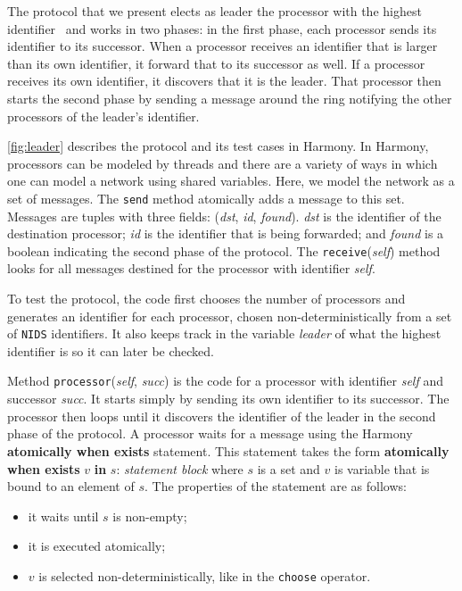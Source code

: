\documentclass{report}
\begin{document}
The protocol that we present elects as leader the processor with the
highest identifier~\cite{CR79} and works in two phases: in the first
phase, each processor sends its identifier to its successor.  When
a processor receives an identifier that is larger than its own
identifier, it forward that to its successor as well.  If a processor
receives its own identifier, it discovers that it is the leader.  That
processor then starts the second phase by sending a message around the
ring notifying the other processors of the leader's identifier.

\autoref{fig:leader} describes the protocol and its test cases in Harmony.
In Harmony, processors can be modeled by threads and there are a variety of ways in
which one can model a network using shared variables.
Here, we model the network as a set of messages.
The \texttt{send} method atomically adds a message to this set.
Messages are tuples with three fields:
(\textit{dst}, \textit{id}, \textit{found}).
\textit{dst} is the identifier of the destination processor;
\textit{id} is the identifier that is being forwarded; and
\textit{found} is a boolean indicating the second phase of the protocol.
The \texttt{receive}(\textit{self}) method looks for all messages
destined for the processor with identifier \textit{self}.

To test the protocol, the code first chooses the number of processors
and generates an identifier for each
processor, chosen non-deterministically from a set of \texttt{NIDS}
identifiers.  It also keeps track in the variable \textit{leader} of
what the highest identifier is so it can later be checked.

Method \texttt{processor}(\textit{self}, \textit{succ}) is the
code for a processor with identifier \textit{self} and successor
\textit{succ}.
It starts simply by sending its own identifier to its successor.
The processor then loops until it discovers the identifier of the
leader in the second phase of the protocol.
A processor waits for a message using the Harmony
\textbf{atomically when exists} statement.
This statement takes the form \textbf{atomically when exists} $v$ \textbf{in} $s$: \emph{statement block}
where $s$ is a set and $v$ is variable that is bound to an element of $s$.
The properties of the statement are as follows:
\begin{itemize}
\item it waits until $s$ is non-empty;
\item it is executed atomically;
\item $v$ is selected non-deterministically, like in the \texttt{choose} operator.
\end{itemize}
%
\end{document}
